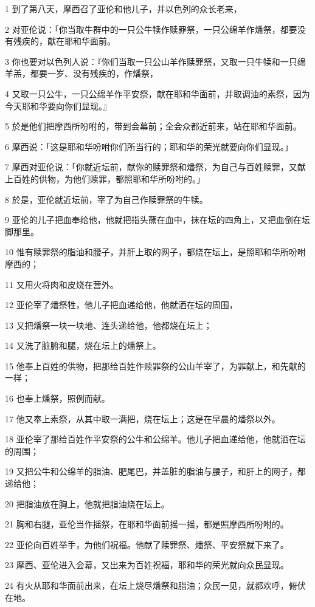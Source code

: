 \par 1 到了第八天，摩西召了亚伦和他儿子，并以色列的众长老来，
\par 2 对亚伦说：「你当取牛群中的一只公牛犊作赎罪祭，一只公绵羊作燔祭，都要没有残疾的，献在耶和华面前。
\par 3 你也要对以色列人说：『你们当取一只公山羊作赎罪祭，又取一只牛犊和一只绵羊羔，都要一岁、没有残疾的，作燔祭，
\par 4 又取一只公牛，一只公绵羊作平安祭，献在耶和华面前，并取调油的素祭，因为今天耶和华要向你们显现。』
\par 5 於是他们把摩西所吩咐的，带到会幕前；全会众都近前来，站在耶和华面前。
\par 6 摩西说：「这是耶和华吩咐你们所当行的；耶和华的荣光就要向你们显现。」
\par 7 摩西对亚伦说：「你就近坛前，献你的赎罪祭和燔祭，为自己与百姓赎罪，又献上百姓的供物，为他们赎罪，都照耶和华所吩咐的。」
\par 8 於是，亚伦就近坛前，宰了为自己作赎罪祭的牛犊。
\par 9 亚伦的儿子把血奉给他，他就把指头蘸在血中，抹在坛的四角上，又把血倒在坛脚那里。
\par 10 惟有赎罪祭的脂油和腰子，并肝上取的网子，都烧在坛上，是照耶和华所吩咐摩西的；
\par 11 又用火将肉和皮烧在营外。
\par 12 亚伦宰了燔祭牲，他儿子把血递给他，他就洒在坛的周围，
\par 13 又把燔祭一块一块地、连头递给他，他都烧在坛上；
\par 14 又洗了脏腑和腿，烧在坛上的燔祭上。
\par 15 他奉上百姓的供物，把那给百姓作赎罪祭的公山羊宰了，为罪献上，和先献的一样；
\par 16 也奉上燔祭，照例而献。
\par 17 他又奉上素祭，从其中取一满把，烧在坛上；这是在早晨的燔祭以外。
\par 18 亚伦宰了那给百姓作平安祭的公牛和公绵羊。他儿子把血递给他，他就洒在坛的周围；
\par 19 又把公牛和公绵羊的脂油、肥尾巴，并盖脏的脂油与腰子，和肝上的网子，都递给他；
\par 20 把脂油放在胸上，他就把脂油烧在坛上。
\par 21 胸和右腿，亚伦当作摇祭，在耶和华面前摇一摇，都是照摩西所吩咐的。
\par 22 亚伦向百姓举手，为他们祝福。他献了赎罪祭、燔祭、平安祭就下来了。
\par 23 摩西、亚伦进入会幕，又出来为百姓祝福，耶和华的荣光就向众民显现。
\par 24 有火从耶和华面前出来，在坛上烧尽燔祭和脂油；众民一见，就都欢呼，俯伏在地。

